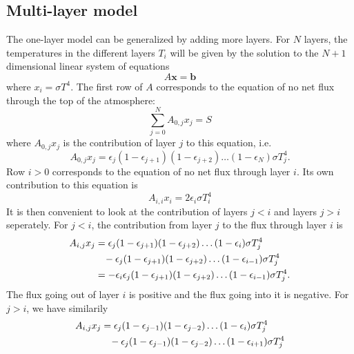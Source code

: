 \documentclass[twocolumn]{article}
\begin{document}
\begin{large}
\subsection*{Multi-layer model}
The one-layer model can be generalized by adding more layers. For $N$ layers, the temperatures in the different layers $T_i$ will be given by the solution to the $N+1$ dimensional linear system of equations
\begin{equation}
    A\mathbf{x} = \mathbf{b}
\end{equation}
where $x_i = \sigma T^4$. The first row of $A$ corresponds to the equation of no net flux through the top of the atmosphere:
\begin{equation}
    \sum_{j=0}^{N}A_{0,j}x_j = S
\end{equation}
where $A_{0,j}x_j$ is the contribution of layer $j$ to this equation, i.e.
\begin{equation}
    A_{0,j}x_j = \epsilon_j(1-\epsilon_{j+1})(1-\epsilon_{j+2})\dots(1-\epsilon_{N})\sigma T_j^4.
\end{equation}
Row $i>0$ corresponds to the equation of no net flux through layer $i$. Its own contribution to this equation is
\begin{equation}
    A_{i,i}x_i = 2\epsilon_i\sigma T_i^4
\end{equation}
It is then convenient to look at the contribution of layers $j<i$ and layers $j>i$ seperately. For $j<i$, the contribution from layer $j$ to the flux through layer $i$ is 
\begin{equation}
    \begin{split}
        A_{i,j}x_j &= \epsilon_j(1-\epsilon_{j+1})(1-\epsilon_{j+2})\dots(1-\epsilon_{i})\sigma T_j^4 \\ 
        &\hspace{0.3cm} -\epsilon_j(1-\epsilon_{j+1})(1-\epsilon_{j+2})\dots(1-\epsilon_{i-1})\sigma T_j^4 \\ 
        &= -\epsilon_i\epsilon_j(1-\epsilon_{j+1})(1-\epsilon_{j+2})\dots(1-\epsilon_{i-1})\sigma T_j^4.
    \end{split}
\end{equation}
The flux going out of layer $i$ is positive and the flux going into it is negative. For $j>i$, we have similarily
\begin{equation}
    \begin{split}
        A_{i,j}x_j &= \epsilon_j(1-\epsilon_{j-1})(1-\epsilon_{j-2})\dots(1-\epsilon_{i})\sigma T_j^4 \\ 
        &\hspace{0.3cm} -\epsilon_j(1-\epsilon_{j-1})(1-\epsilon_{j-2})\dots(1-\epsilon_{i+1})\sigma T_j^4 \\ 

\end{split}
\end{equation}
\end{large}
\end{document}
